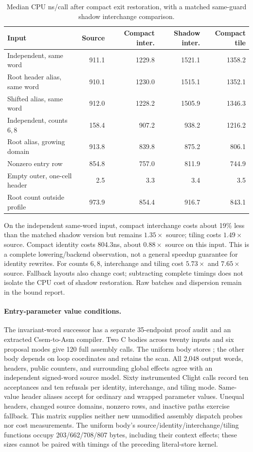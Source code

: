 \begin{table}[t]
\centering
\caption{Median CPU ns/call after compact exit restoration, with a matched
same-guard shadow interchange comparison.}
\label{tab:compact-cost}
\begin{tabular}{lrrrr}
\hline
Input & Source & Compact inter. & Shadow inter. & Compact tile\\
\hline
Independent, same word & 911.1 & 1229.8 & 1521.1 & 1358.2\\
Root header alias, same word & 910.1 & 1230.0 & 1515.1 & 1352.1\\
Shifted alias, same word & 912.0 & 1228.2 & 1505.9 & 1346.3\\
Independent, counts $6,8$ & 158.4 & 907.2 & 938.2 & 1216.2\\
Root alias, growing domain & 913.8 & 839.8 & 875.2 & 806.1\\
Nonzero entry row & 854.8 & 757.0 & 811.9 & 744.9\\
Empty outer, one-cell header & 2.5 & 3.3 & 3.4 & 3.5\\
Root count outside profile & 973.9 & 854.4 & 916.7 & 843.1\\
\hline
\end{tabular}
\end{table}

On the independent same-word input, compact interchange costs about 19\%
less than the matched shadow version but remains $1.35\times$ source; tiling
costs $1.49\times$ source. Compact identity costs 804.3ns, about $0.88\times$
source on this input. This is a complete lowering/backend observation, not a
general speedup guarantee for identity rewrites. For counts $6,8$, interchange
and tiling cost $5.73\times$ and $7.65\times$ source. Fallback layouts also
change cost; subtracting complete timings does not isolate the CPU cost of
shadow restoration. Raw batches and dispersion remain in the bound report.

\paragraph{Entry-parameter value conditions.}
The invariant-word successor has a separate 35-endpoint proof audit and an
extracted Csem-to-Asm compiler. Two C bodies across twenty inputs and six
proposal modes give 120 full assembly calls. The uniform body stores
; the other body depends on loop coordinates and retains
the scan. All 2,048 output words, headers, public counters, and surrounding
global effects agree with an independent signed-word source model.
Sixty instrumented Clight calls record ten acceptances and ten refusals per
identity, interchange, and tiling mode. Same-value header aliases accept for
ordinary and wrapped parameter values. Unequal headers, changed source domains,
nonzero rows, and inactive paths exercise fallback. This matrix supplies neither
new unmodified assembly dispatch probes nor cost measurements. The uniform
body's source/identity/interchange/tiling functions occupy 203/662/708/807 bytes,
including their context effects; these sizes cannot be paired with timings of
the preceding literal-store kernel.

